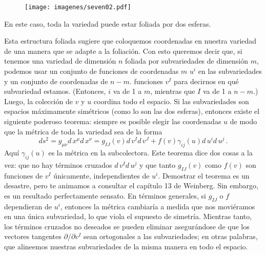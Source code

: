 \documentclass[11pt,b5paper,openany,twoside]{book}
\newcommand{\mn}{{\mu\nu}}
\begin{document}
\begin{figure}[h]
\centering
\texttt{[image: imagenes/seven02.pdf]}
\end{figure}

\noindent
En este caso, toda la variedad puede estar foliada por dos esferas.

Esta estructura foliada sugiere que coloquemos coordenadas en nuestra variedad de una manera que se adapte a la foliación.
Con esto queremos decir que, si tenemos una variedad de dimensión $n$ foliada por subvariedades de dimensión $m$, podemos usar un conjunto de funciones de coordenadas $m$ $u^i$ en las subvariedades y un conjunto de coordenadas de $n-m$. funciones $v^I$ para decirnos en qué subvariedad estamos.
(Entonces, $i$ va de 1 a $m$, mientras que $I$ va de 1 a $n-m$.)
Luego, la colección de $v$ y $u$ coordina todo el espacio.
Si las subvariedades son espacios máximamente simétricos (como lo son las dos esferas), entonces existe el siguiente poderoso teorema: siempre es posible elegir las coordenadas $u$ de modo que la métrica de toda la variedad sea de la forma
\begin{equation}
ds^2 = g_\mn  d\,x^\mu  d\,x^\nu = g_{IJ}(v) d\,v^I  d\,v^J
+f(v)\gamma_{ij}(u) d\,u^i  d\,u^j\,.\label{7.2}
\end{equation}
Aquí $\gamma_{ij}(u)$ es la métrica en la subcolectora.
Este teorema dice dos cosas a la vez: que no hay términos cruzados $ d\,v^I  d\,u^j$ y que tanto $g_{IJ}(v)$ como $f(v)$ son funciones de $v^I$ únicamente, independientes de $u^i$.
Demostrar el teorema es un desastre, pero te animamos a consultar el capítulo 13 de Weinberg.
Sin embargo, es un resultado perfectamente sensato.
En términos generales, si $g_{IJ}$ o $f$ dependieran de $u^i$, entonces la métrica cambiaría a medida que nos moviéramos en una única subvariedad, lo que viola el supuesto de simetría.
Mientras tanto, los términos cruzados no deseados se pueden eliminar asegurándose de que los vectores tangentes $\partial/\partial v^I$ sean ortogonales a las subvariedades; en otras palabras, que alineemos nuestras subvariedades de la misma manera en todo el espacio.
\end{document}
